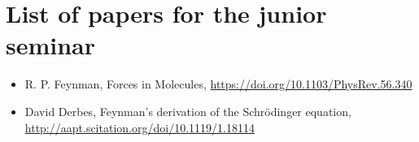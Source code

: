 \documentclass[A4paper, 12pt]{article}
\begin{document}
\section*{List of papers for the junior seminar}

\begin{itemize}
  \item
    R. P. Feynman, Forces in Molecules,
    \url{https://doi.org/10.1103/PhysRev.56.340}
  \item
    David Derbes, Feynman’s derivation of the Schrödinger equation,
    \url{http://aapt.scitation.org/doi/10.1119/1.18114}

\end{itemize}
\end{document}
